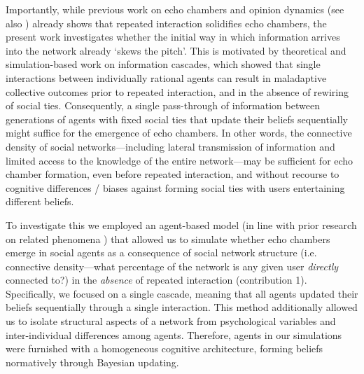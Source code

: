\documentclass[fleqn,10pt]{wlscirep}
\begin{document}
Importantly, while previous work on echo chambers \cite{madsen2018large, madsen2017growing} and opinion dynamics (see also \cite{lorenz2007continuous}) already shows that repeated interaction solidifies echo chambers, the present work investigates whether the initial way in which information arrives into the network already `skews the pitch'. This is motivated by theoretical  \cite{bikhchandani1992theory} and simulation-based \cite{pilditch2017opinion} work on information cascades, which showed that single interactions between individually rational agents can result in maladaptive collective outcomes prior to repeated interaction, and in the absence of rewiring of social ties. Consequently, a single pass-through of information between generations of agents with fixed social ties that update their beliefs sequentially might suffice for the emergence of echo chambers. In other words, the connective density of social networks---including lateral transmission of information and limited access to the knowledge of the entire network---may be sufficient for echo chamber formation, even before repeated interaction, and without recourse to cognitive differences / biases against forming social ties with users entertaining different beliefs. 

To investigate this we employed an agent-based model (in line with prior research on related phenomena \cite{madsen2017growing, madsen2018large}) that allowed us to simulate whether echo chambers emerge in social agents as a consequence of social network structure (i.e. connective density---what percentage of the network is any given user \textit{directly} connected to?) in the \emph{absence} of repeated interaction (contribution 1). Specifically, we focused on a single cascade, meaning that all agents updated their beliefs sequentially through a single interaction. This method additionally allowed us to isolate structural aspects of a network from psychological variables and inter-individual differences among agents. Therefore, agents in our simulations were furnished with a homogeneous cognitive architecture, forming beliefs normatively through Bayesian updating. 
\end{document}
